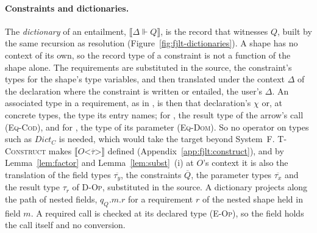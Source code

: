 \paragraph{Constraints and dictionaries.}
The \emph{dictionary} of an entailment, $\llbracket \Delta \Vdash Q \rrbracket$, is the record that witnesses $Q$, built by the same recursion as resolution (Figure~\ref{fig:fjlt-dictionaries}).
A shape has no context of its own, so the record type of a constraint is not a function of the shape alone.
The requirements are substituted in the source, the constraint's types for the shape's type variables, and then translated under the context $\Delta$ of the declaration where the constraint is written or entailed, the user's $\Delta$.
An associated type in a requirement, as  in , is then that declaration's $\chi$ or, at concrete types, the type its entry names; for , the result type of the arrow's call (\textsc{Eq-Cod}), and for , the type of its parameter (\textsc{Eq-Dom}).
So no operator on types such as $\mathit{Dict}_C$ is needed, which would take the target beyond System~F.
\textsc{T-Construct} makes $\llbracket O\texttt{<}\overline{\tau}\texttt{>} \rrbracket$ defined (Appendix~\ref{app:fjlt:construct}), and by Lemma~\ref{lem:factor} and Lemma~\ref{lem:subst}~(i) at $O$'s context it is also the translation of the field types $\overline{\tau_y}$, the constraints $\overline{Q}$, the parameter types $\overline{\tau_x}$ and the result type $\tau_r$ of \textsc{D-Op}, substituted in the source.
A dictionary projects along the path of nested fields, $q_Q.m.r$ for a requirement $r$ of the nested shape held in field $m$.
A required call is checked at its declared type (\textsc{E-Op}), so the field holds the call itself and no conversion.

